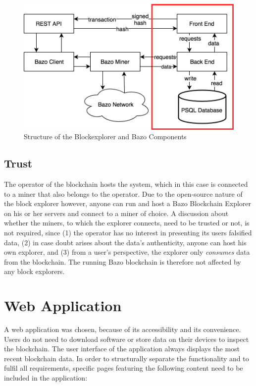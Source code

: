 \begin{figure}[h]
  \includegraphics[scale=0.4]{system.png}
  \centering
  \caption{Structure of the Blockexplorer and Bazo Components}
  \label{fig:structure}
\end{figure}

\subsection{Trust}
The operator of the blockchain hosts the system, which in this case is connected to a miner that also belongs to the operator. Due to the open-source nature of the block explorer however, anyone can run and host a Bazo Blockchain Explorer on his or her servers and connect to a miner of choice. A discussion about whether the miners, to which the explorer connects, need to be trusted or not, is not required, since (1) the operator has no interest in presenting its users falsified data, (2) in case doubt arises about the data's authenticity, anyone can host his own explorer, and (3) from a user's perspective, the explorer only \emph{consumes} data from the blockchain. The running Bazo blockchain is therefore not affected by any block explorers.

\section{Web Application}
A web application was chosen, because of its accessibility and its convenience. Users do not need to download software or store data on their devices to inspect the blockchain. The user interface of the application always displays the most recent blockchain data.  In order to structurally separate the functionality and to fulfil all requirements, specific pages featuring the following content need to be included in the application:

